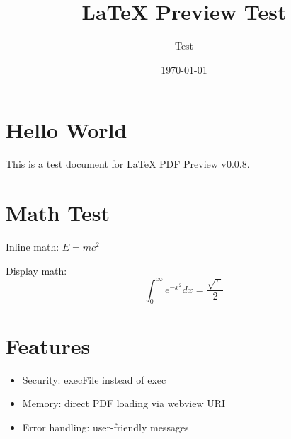 \documentclass{article}
\title{LaTeX Preview Test}
\author{Test}
\date{\today}
\begin{document}
\maketitle

\section{Hello World}
This is a test document for LaTeX PDF Preview v0.0.8.

\section{Math Test}
Inline math: $E = mc^2$

Display math:
\[
\int_{0}^{\infty} e^{-x^2} dx = \frac{\sqrt{\pi}}{2}
\]

\section{Features}
\begin{itemize}
    \item Security: execFile instead of exec
    \item Memory: direct PDF loading via webview URI
    \item Error handling: user-friendly messages
\end{itemize}
\end{document}
